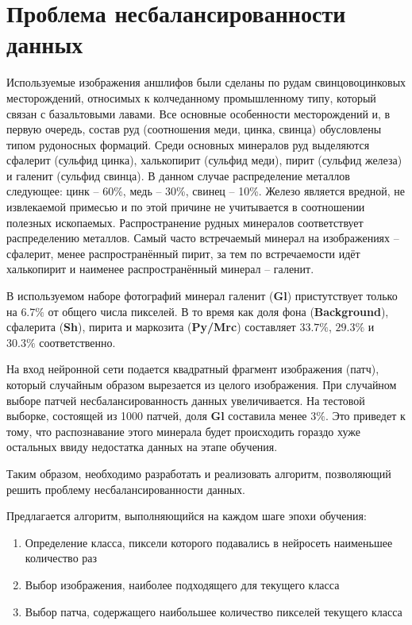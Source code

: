 \section{Проблема несбалансированности данных}
Используемые изображения аншлифов были сделаны по рудам свинцовоцинковых месторождений, относимых к колчеданному промышленному типу, который
связан с базальтовыми лавами. Все основные особенности месторождений и, в первую
очередь, состав руд (соотношения меди, цинка, свинца) обусловлены типом рудоносных
формаций. Среди основных минералов руд выделяются сфалерит (сульфид цинка),
халькопирит (сульфид меди), пирит (сульфид железа) и галенит (сульфид свинца). В
данном случае распределение металлов следующее: цинк – 60\%, медь – 30\%, свинец – 10\%.
Железо является вредной, не извлекаемой примесью и по этой причине не учитывается в
соотношении полезных ископаемых. Распространение рудных минералов соответствует
распределению металлов. Самый часто встречаемый минерал на изображениях – сфалерит,
менее распространённый пирит, за тем по встречаемости идёт халькопирит и наименее
распространённый минерал – галенит. 
\par В используемом наборе фотографий минерал галенит (\textbf{Gl}) пристутствует только на $6.7\%$ от общего числа пикселей. В то время как доля фона (\textbf{Background}), сфалерита (\textbf{Sh}), пирита и маркозита (\textbf{Py/Mrc}) составляет $33.7\%$, $29.3\%$ и $30.3\%$ соответственно.
\par
На вход нейронной сети подается квадратный фрагмент изображения (патч), который случайным образом вырезается из целого изображения. При случайном выборе патчей несбалансированность данных увеличивается. На тестовой выборке, состоящей из 1000 патчей, доля \textbf{Gl} составила менее $3\%$. Это приведет к тому, что распознавание этого минерала будет происходить гораздо хуже остальных ввиду недостатка данных на этапе обучения.
\par Таким образом, необходимо разработать и реализовать алгоритм, позволяющий решить проблему несбалансированности данных.
\newline
\newline
\newline
\par
Предлагается алгоритм, выполняющийся на каждом шаге эпохи обучения:
\begin{enumerate}[nosep]
    \item Определение класса, пиксели которого подавались в нейросеть наименьшее количество раз
    \item Выбор изображения, наиболее подходящего для текущего класса
    \item Выбор патча, содержащего наибольшее количество пикселей текущего класса
\end{enumerate}
